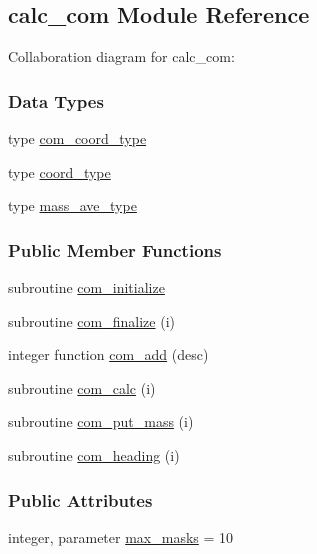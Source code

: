 \hypertarget{classcalc__com}{\subsection{calc\-\_\-com Module Reference}
\label{classcalc__com}
}


Collaboration diagram for calc\-\_\-com\-:
\subsubsection*{Data Types}
\begin{DoxyCompactItemize}
\item 
type \hyperlink{structcalc__com_1_1com__coord__type}{com\-\_\-coord\-\_\-type}
\item 
type \hyperlink{structcalc__com_1_1coord__type}{coord\-\_\-type}
\item 
type \hyperlink{structcalc__com_1_1mass__ave__type}{mass\-\_\-ave\-\_\-type}
\end{DoxyCompactItemize}
\subsubsection*{Public Member Functions}
\begin{DoxyCompactItemize}
\item 
subroutine \hyperlink{classcalc__com_ad6243ed04b2e3251f61360aa1e04b1b0}{com\-\_\-initialize}
\item 
subroutine \hyperlink{classcalc__com_a45389417b8edfa5f656068b71161be03}{com\-\_\-finalize} (i)
\item 
integer function \hyperlink{classcalc__com_a651966ec97d83c3b1dfa2698148984c7}{com\-\_\-add} (desc)
\item 
subroutine \hyperlink{classcalc__com_a8d29a63ddb97850c536c8acda9856013}{com\-\_\-calc} (i)
\item 
subroutine \hyperlink{classcalc__com_ab0d8420cb91643f1d8aed24ea75275df}{com\-\_\-put\-\_\-mass} (i)
\item 
subroutine \hyperlink{classcalc__com_ac59b689603137407083a080128e002f0}{com\-\_\-heading} (i)
\end{DoxyCompactItemize}
\subsubsection*{Public Attributes}
\begin{DoxyCompactItemize}
\item 
integer, parameter \hyperlink{classcalc__com_a5fee42e745cdac6911627aba153ac220}{max\-\_\-masks} = 10
\end{DoxyCompactItemize}

